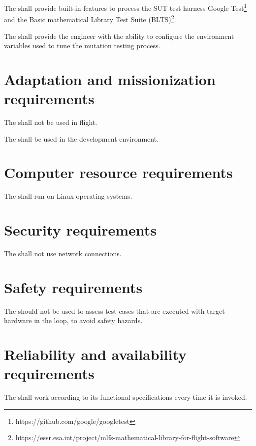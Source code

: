 \RQ{} The \FAQAS shall provide built-in features to process the SUT test harness Google Test\footnote{https://github.com/google/googletest} and the Basic mathematical Library Test Suite (BLTS)\footnote{https://essr.esa.int/project/mlfs-mathematical-library-for-flight-software}.


\RQ{} The \FAQAS shall provide the engineer with the ability to configure the environment variables used to tune the mutation testing process.



\section{Adaptation and missionization requirements}

\RQ{} The \FAQAS shall not be used in flight.

\RQ{} The \FAQAS shall be used in the development environment.




\section{Computer resource requirements}


\RQ{} The \FAQAS shall run on Linux operating systems.



\section{Security requirements }

\RQ{} The \FAQAS shall not use network connections.

\section{Safety requirements}

\RQ{} The \FAQAS should not be used to assess test cases that are executed with target hardware in the loop, to avoid safety hazards.

\section{Reliability and availability requirements}

\RQ{} The \FAQAS shall work according to its functional specifications every time it is invoked.


